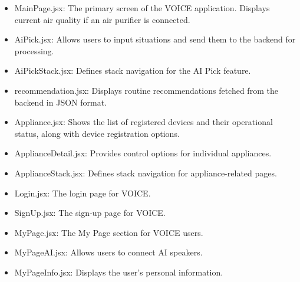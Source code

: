 \documentclass[conference]{IEEEtran}
\begin{document}
\begin{enumerate}[label=\arabic*]
\begin{itemize}[label=-]
        \item MainPage.jsx: The primary screen of the VOICE application. Displays current air quality if an air purifier is connected.
        \vspace{0.7em}
        
        \item AiPick.jsx: Allows users to input situations and send them to the backend for processing.
        \vspace{0.7em}
        
        \item AiPickStack.jsx: Defines stack navigation for the AI Pick feature.
        \vspace{0.7em}

        \item recommendation.jsx: Displays routine recommendations fetched from the backend in JSON format.
        \vspace{0.7em}

        \item Appliance.jsx: Shows the list of registered devices and their operational status, along with device registration options.
        \vspace{0.7em}

        \item ApplianceDetail.jsx: Provides control options for individual appliances.
        \vspace{0.7em}

        \item ApplianceStack.jsx: Defines stack navigation for appliance-related pages.
        \vspace{0.7em}

        \item Login.jsx: The login page for VOICE.
        \vspace{0.7em}

        \item SignUp.jsx: The sign-up page for VOICE.
        \vspace{0.7em}

        \item MyPage.jsx: The My Page section for VOICE users.
        \vspace{0.7em}

        \item MyPageAI.jsx: Allows users to connect AI speakers.
        \vspace{0.7em}

        \item MyPageInfo.jsx: Displays the user's personal information.
        \vspace{0.7em}


\end{itemize}
\end{enumerate}
\end{document}
